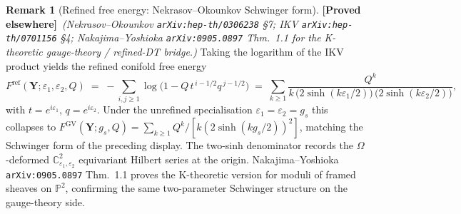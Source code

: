 \documentclass[11pt]{amsart}
\theoremstyle{definition}
\newtheorem{remark}[theorem]{Remark}
\providecommand{\bY}{\mathbf{Y}}
\providecommand{\bC}{\mathbb{C}}
\providecommand{\bP}{\mathbb{P}}
\providecommand{\ClaimStatusProvedElsewhere}{\textbf{\textsf{[Proved elsewhere]}}}
\begin{document}
\begin{remark}[Refined free energy: Nekrasov--Okounkov Schwinger form]
\label{rem:refined-free-energy-NO}
\ClaimStatusProvedElsewhere\ \emph{(Nekrasov--Okounkov
\texttt{arXiv:hep-th/0306238} \S7; IKV \texttt{arXiv:hep-th/0701156}
\S4; Nakajima--Yoshioka \texttt{arXiv:0905.0897} Thm.~1.1 for the
K-theoretic gauge-theory / refined-DT bridge.)}
Taking the logarithm of the IKV product yields the refined conifold
free energy
\[
  F^{\mathrm{ref}}(\bY;\varepsilon_{1},\varepsilon_{2},Q)
  \;=\;
  -\sum_{i,j \geq 1} \log\!\bigl(1 - Q\,t^{\,i-1/2}q^{\,j-1/2}\bigr)
  \;=\;
  \sum_{k \geq 1}
    \frac{Q^{k}}{k\,
      \bigl(2\sinh(k\varepsilon_{1}/2)\bigr)\,
      \bigl(2\sinh(k\varepsilon_{2}/2)\bigr)},
\]
with $t = e^{i\varepsilon_{1}}$, $q = e^{i\varepsilon_{2}}$. Under the
unrefined specialisation $\varepsilon_{1} = \varepsilon_{2} = g_{s}$
this collapses to
$F^{\mathrm{GV}}(\bY; g_s, Q) = \sum_{k \geq 1} Q^{k}/[k(2\sinh(k g_s/2))^{2}]$,
matching the Schwinger form of the preceding display. The two-sinh
denominator records the $\Omega$-deformed $\bC^{2}_{\varepsilon_{1},
\varepsilon_{2}}$ equivariant Hilbert series at the origin.
Nakajima--Yoshioka \texttt{arXiv:0905.0897} Thm.~1.1 proves the
K-theoretic version for moduli of framed sheaves on $\bP^{2}$,
confirming the same two-parameter Schwinger structure on the
gauge-theory side.
\end{remark}
\end{document}
